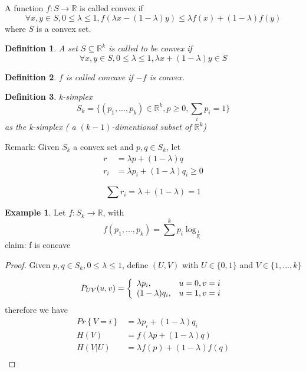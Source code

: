 \documentclass[twoside]{article}
\newtheorem{definition}{Definition}[section]
\theoremstyle{definition} %
\newtheorem{example}{Example}
\renewcommand{\Pr}[1]{Pr\left\{#1\right\}}
\def\R{\mathbb{R}}
\begin{document}
\begin{appendices}
A function $f : S \rightarrow \R $ is called convex if
\[ \forall x,y \in S, 0 \leq \lambda \leq 1,  f(\lambda x - (1 - \lambda)y) \leq \lambda f(x) + (1 - \lambda) f(y) \]
where $S$ is a convex set.

\begin{definition}
  A set $S \subseteq \R^k$ is called to be convex if
  \[ \forall x,y \in S, 0 \leq \lambda \leq 1,  \lambda x + (1 - \lambda) y \in S\]
\end{definition}

\begin{definition}
  $f$ is called concave if $-f$ is convex.
\end{definition}

\begin{definition}{k-simplex}
\[ S_k = \{(p_1, ..., p_k) \in \R^k , p \geq 0, \sum_i p_i = 1 \} \]
as the k-simplex ( a $(k-1)$-dimentional subset of $\R^k$)
\end{definition}

Remark:
Given $S_k$ a convex set and $p,q \in S_k$, let
\begin{align*}
  r   &= \lambda p + (1 - \lambda)q \\
  r_i &= \lambda p_i + (1 - \lambda) q_i \geq 0
\end{align*}

\[ \sum r_i = \lambda + (1 - \lambda) = 1 \]

\begin{example}
  Let $f : S_k \rightarrow \R $, with
  \[ f(p_1, ..., p_k) = \sum^k p_i \log_{\frac{1}{p_i}} \]
  claim: f is concave

  \begin{proof}
    Given $p, q \in S_k, 0 \leq \lambda \leq 1$, define $(U, V)$ with $U \in \{0, 1\}$ and $V \in \{1, ..., k\}$

    \begin{align*}
      P_{UV}(u, v) =
      \left\{
      \begin{array}{l l}
        \lambda p_i, & u=0, v=i \\
        (1 - \lambda)q_i, & u=1, v=i
      \end{array}
      \right.
    \end{align*}
    therefore we have
    \begin{align*}
      \Pr{V = i} &= \lambda p_i + (1 - \lambda) q_i \\
      H(V) &= f(\lambda p + (1 - \lambda) q) \\
      H(V | U) &= \lambda f(p) + (1 - \lambda) f(q) \\
    \end{align*}
  \end{proof}
\end{example}



\end{appendices}
\end{document}
